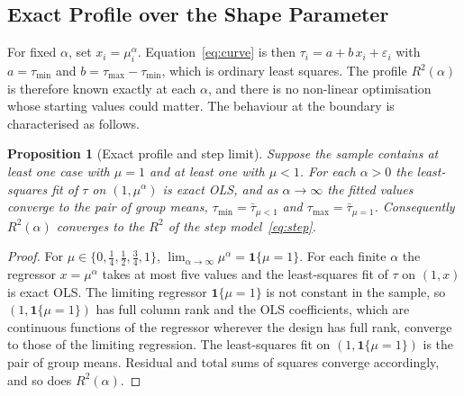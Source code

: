 \documentclass[11pt,letterpaper]{article}
\theoremstyle{definition}
\theoremstyle{plain}
\newtheorem{proposition}[definition]{Proposition}
\begin{document}
\subsection{Exact Profile over the Shape Parameter}\label{sec:profile}
For fixed $\alpha$, set $x_i=\mu_i^{\alpha}$. Equation~\eqref{eq:curve} is then $\tau_i=a+b\,x_i+\varepsilon_i$ with $a=\tau_{\min}$ and $b=\tau_{\max}-\tau_{\min}$, which is ordinary least squares. The profile $R^2(\alpha)$ is therefore known exactly at each $\alpha$, and there is no non-linear optimisation whose starting values could matter. The behaviour at the boundary is characterised as follows.

\begin{proposition}[Exact profile and step limit]\label{prop:step}
Suppose the sample contains at least one case with $\mu=1$ and at least one with $\mu<1$. For each $\alpha>0$ the least-squares fit of $\tau$ on $(1,\mu^{\alpha})$ is exact OLS, and as $\alpha\to\infty$ the fitted values converge to the pair of group means, $\tau_{\min}=\bar\tau_{\mu<1}$ and $\tau_{\max}=\bar\tau_{\mu=1}$. Consequently $R^2(\alpha)$ converges to the $R^2$ of the step model~\eqref{eq:step}.
\end{proposition}

\begin{proof}
For $\mu\in\{0,\tfrac14,\tfrac12,\tfrac34,1\}$, $\lim_{\alpha\to\infty}\mu^{\alpha}=\mathbf 1\{\mu=1\}$. For each finite $\alpha$ the regressor $x=\mu^{\alpha}$ takes at most five values and the least-squares fit of $\tau$ on $(1,x)$ is exact OLS. The limiting regressor $\mathbf 1\{\mu=1\}$ is not constant in the sample, so $(1,\mathbf 1\{\mu=1\})$ has full column rank and the OLS coefficients, which are continuous functions of the regressor wherever the design has full rank, converge to those of the limiting regression. The least-squares fit on $(1,\mathbf 1\{\mu=1\})$ is the pair of group means. Residual and total sums of squares converge accordingly, and so does $R^2(\alpha)$.
\end{proof}
\end{document}

